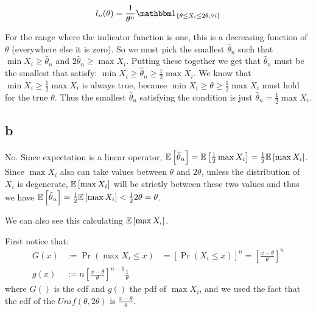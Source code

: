 \documentclass[12pt]{paper}
\begin{document}
\begin{align*}
 l_n(\theta)=\frac{1}{\theta^n}\indicate{\theta \le X_i \le 2\theta, \forall i}
\end{align*}

For the range where the indicator function is one, this is a decreasing function of $\theta$ (everywhere else it is zero). So we must pick the smallest $\hat{\theta}_n$ such that $\min{X_i}\ge\hat{\theta}_n$ and $2\hat{\theta}_n\ge\max{X_i}$. Putting these together we get that $\hat{\theta}_n$  must be the smallest that satisfy: $\min{X_i}\ge\hat{\theta}_n\ge\frac{1}{2}\max{X_i}$. We know that $\min{X_i}\ge\frac{1}{2}\max{X_i}$ is always true, because $\min{X_i}\ge\theta\ge\frac{1}{2}\max{X_i}$ must hold for the true $\theta$. Thus the smallest $\hat{\theta}_n$ satisfying the condition is just $\hat{\theta}_n=\frac{1}{2}\max{X_i}$.

\subsection*{b}

No. Since expectation is a linear operator, $\mathbb{E} \left [ \hat{\theta}_n \right ]=\mathbb{E} \left [ \frac{1}{2}\max{X_i} \right ]=\frac{1}{2}\mathbb{E} \left [ \max{X_i} \right ]$. Since $\max{X_i}$ also can take values between $\theta$ and $2\theta$, unless the distribution of $X_i$ is degenerate, $\mathbb{E} \left [ \max{X_i} \right ]$ will be strictly between these two values and  thus we have  $\mathbb{E} \left [ \hat{\theta}_n \right ]=\frac{1}{2}\mathbb{E} \left [ \max{X_i} \right ] < \frac{1}{2} 2 \theta=\theta$.

We can also see this calculating $\mathbb{E} \left [ \max{X_i} \right ]$.

First notice that:
\begin{align*}
G(x)&:=\Pr(\max{X_i}\le x)&=[\Pr(X_i\le x)]^n=[\frac{x-\theta}{\theta}]^n\\
g(x)&:=n[\frac{x-\theta}{\theta}]^{n-1}\frac{1}{\theta}
\end{align*}
\noindent where $G()$ is the cdf and $g()$ the pdf of $\max{X_i}$, and we used the fact that the cdf of the $Unif(\theta,2\theta)$ is $\frac{x-\theta}{\theta}$.
\end{document}
